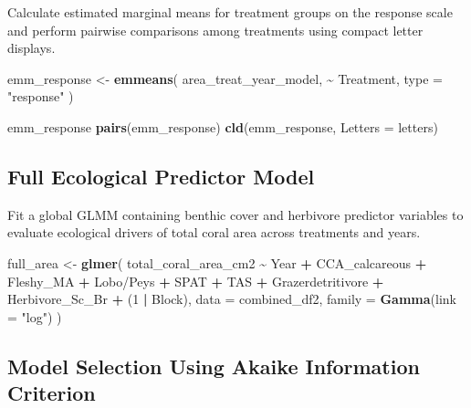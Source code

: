 \documentclass[
]{article}
\newenvironment{Shaded}{\begin{snugshade}}{\end{snugshade}}
\newcommand{\AttributeTok}[1]{\textcolor[rgb]{0.13,0.29,0.53}{#1}}
\newcommand{\DecValTok}[1]{\textcolor[rgb]{0.00,0.00,0.81}{#1}}
\newcommand{\FunctionTok}[1]{\textcolor[rgb]{0.13,0.29,0.53}{\textbf{#1}}}
\newcommand{\NormalTok}[1]{#1}
\newcommand{\OtherTok}[1]{\textcolor[rgb]{0.56,0.35,0.01}{#1}}
\newcommand{\SpecialCharTok}[1]{\textcolor[rgb]{0.81,0.36,0.00}{\textbf{#1}}}
\newcommand{\StringTok}[1]{\textcolor[rgb]{0.31,0.60,0.02}{#1}}
\begin{document}
Calculate estimated marginal means for treatment groups on the response
scale and perform pairwise comparisons among treatments using compact
letter displays.

\begin{Shaded}
\begin{Highlighting}[]
\NormalTok{emm\_response }\OtherTok{\textless{}{-}} \FunctionTok{emmeans}\NormalTok{(}
\NormalTok{  area\_treat\_year\_model,}
  \SpecialCharTok{\textasciitilde{}}\NormalTok{ Treatment,}
  \AttributeTok{type =} \StringTok{"response"}
\NormalTok{)}

\NormalTok{emm\_response}
\FunctionTok{pairs}\NormalTok{(emm\_response)}
\FunctionTok{cld}\NormalTok{(emm\_response, }\AttributeTok{Letters =}\NormalTok{ letters)}
\end{Highlighting}
\end{Shaded}

\subsection{Full Ecological Predictor
Model}\label{full-ecological-predictor-model}

Fit a global GLMM containing benthic cover and herbivore predictor
variables to evaluate ecological drivers of total coral area across
treatments and years.

\begin{Shaded}
\begin{Highlighting}[]
\NormalTok{full\_area }\OtherTok{\textless{}{-}} \FunctionTok{glmer}\NormalTok{(}
\NormalTok{  total\_coral\_area\_cm2 }\SpecialCharTok{\textasciitilde{}}
\NormalTok{    Year }\SpecialCharTok{+}
\NormalTok{    CCA\_calcareous }\SpecialCharTok{+}
\NormalTok{    Fleshy\_MA }\SpecialCharTok{+}
    \StringTok{\textasciigrave{}}\AttributeTok{Lobo/Peys}\StringTok{\textasciigrave{}} \SpecialCharTok{+}
\NormalTok{    SPAT }\SpecialCharTok{+}
\NormalTok{    TAS }\SpecialCharTok{+}
\NormalTok{    Grazerdetritivore }\SpecialCharTok{+}
\NormalTok{    Herbivore\_Sc\_Br }\SpecialCharTok{+}
\NormalTok{    (}\DecValTok{1} \SpecialCharTok{|}\NormalTok{ Block),}
  \AttributeTok{data =}\NormalTok{ combined\_df2,}
  \AttributeTok{family =} \FunctionTok{Gamma}\NormalTok{(}\AttributeTok{link =} \StringTok{"log"}\NormalTok{)}
\NormalTok{)}
\end{Highlighting}
\end{Shaded}

\subsection{Model Selection Using Akaike Information
Criterion}\label{model-selection-using-akaike-information-criterion}
\end{document}

